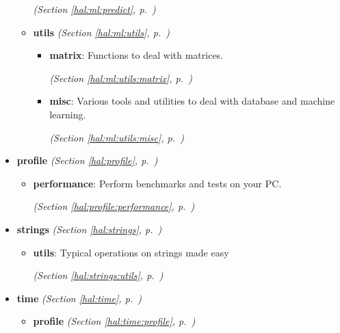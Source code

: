 \begin{itemize}
\begin{itemize}
  \textit{(Section \ref{hal:ml:predict}, p.~\pageref{hal:ml:predict})}

    \item \textbf{utils}
  \textit{(Section \ref{hal:ml:utils}, p.~\pageref{hal:ml:utils})}

      \begin{itemize}
    \setlength{\parskip}{0ex}
        \item \textbf{matrix}: Functions to deal with matrices. 


  \textit{(Section \ref{hal:ml:utils:matrix}, p.~\pageref{hal:ml:utils:matrix})}

        \item \textbf{misc}: Various tools and utilities to deal with database and machine learning. 


  \textit{(Section \ref{hal:ml:utils:misc}, p.~\pageref{hal:ml:utils:misc})}

      \end{itemize}
  \end{itemize}
\item \textbf{profile}
  \textit{(Section \ref{hal:profile}, p.~\pageref{hal:profile})}

  \begin{itemize}
\setlength{\parskip}{0ex}
    \item \textbf{performance}: Perform benchmarks and tests on your PC. 


  \textit{(Section \ref{hal:profile:performance}, p.~\pageref{hal:profile:performance})}

  \end{itemize}
\item \textbf{strings}
  \textit{(Section \ref{hal:strings}, p.~\pageref{hal:strings})}

  \begin{itemize}
\setlength{\parskip}{0ex}
    \item \textbf{utils}: Typical operations on strings made easy 


  \textit{(Section \ref{hal:strings:utils}, p.~\pageref{hal:strings:utils})}

  \end{itemize}
\item \textbf{time}
  \textit{(Section \ref{hal:time}, p.~\pageref{hal:time})}

  \begin{itemize}
\setlength{\parskip}{0ex}
    \item \textbf{profile}
  \textit{(Section \ref{hal:time:profile}, p.~\pageref{hal:time:profile})}


\end{itemize}
\end{itemize}
